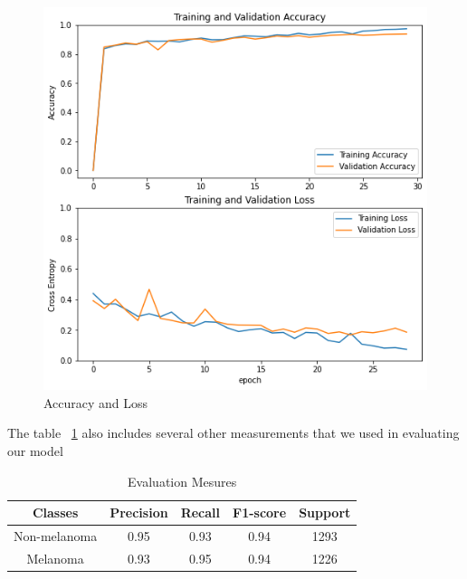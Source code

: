     \begin{figure}[htbp]
    \begin{center}
    \includegraphics[width=15cm]{./chapter-05-our-contribution/1.png}
    \end{center}
    \caption{Accuracy and Loss}
    \label{fig:acc-loss}
    \end{figure}

    The table ~\ref{tab:eval} also includes several other measurements that we used in evaluating our model

    \setlength{\arrayrulewidth}{0.5mm}
    \setlength{\tabcolsep}{18pt}
    \renewcommand{\arraystretch}{1.5}

    \begin{table}[htbp]
    \begin{center}
        \begin{tabular}{|c|c|c|c|c|}
        \hline 
        Classes & Precision & Recall & F1-score & Support \\ 
        \hline 
        Non-melanoma & 0.95 & 0.93 & 0.94 & 1293 \\ 
        \hline 
        Melanoma & 0.93 & 0.95 & 0.94 & 1226 \\ 
        \hline 
        \end{tabular} 
    \end{center}
    \caption{Evaluation Mesures}
    \label{tab:eval}
    \end{table}






